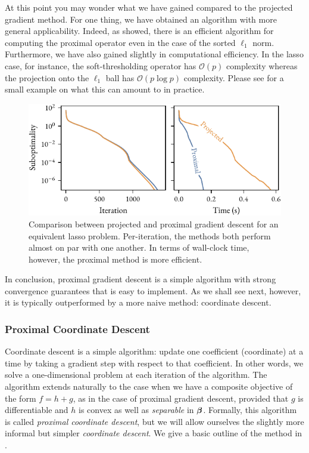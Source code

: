 At this point you may wonder what we have gained compared to the projected gradient method. For one thing, we have obtained an algorithm with more general applicability. Indeed, as \textcite{bogdan2015} showed, there is an efficient algorithm for computing the proximal operator even in the case of the sorted \(\ell_1\) norm. Furthermore, we have also gained slightly in computational efficiency. In the lasso case, for instance, the soft-thresholding operator has \(\mathcal{O}(p)\) complexity whereas the projection onto the \(\ell_1\) ball has \(\mathcal{O}(p\log p)\) complexity. Please see  for a small example on what this can amount to in practice.

\begin{figure}[htpb]
  \centering
  \includegraphics[]{figures/lasso-projgrad-comp.pdf}
  \caption{%
    Comparison between projected and proximal gradient descent for an equivalent lasso problem.
    Per-iteration, the methods both perform almost on par with one another. In terms of wall-clock time, however, the proximal method is more efficient.
  }
  \label{fig:lasso-projgrad-comp}
\end{figure}

In conclusion, proximal gradient descent is a simple algorithm with strong convergence guarantees that is easy to implement. As we shall see next, however, it is typically outperformed by a more naive method: coordinate descent.

\subsubsection{Proximal Coordinate Descent}

Coordinate descent is a simple algorithm: update one coefficient (coordinate) at a time by taking a gradient step with respect to that coefficient. In other words, we solve a one-dimensional problem at each iteration of the algorithm. The algorithm extends naturally to the case when we have a composite objective of the form \(f = h + g\), as in the case of proximal gradient descent, provided that \(g\) is differentiable and \(h\) is convex as well as \emph{separable} in \(\boldsymbol{\beta}\). Formally, this algorithm is called \emph{proximal coordinate descent}, but we will allow ourselves the slightly more informal but simpler \emph{coordinate descent}. We give a basic outline of the method in .

